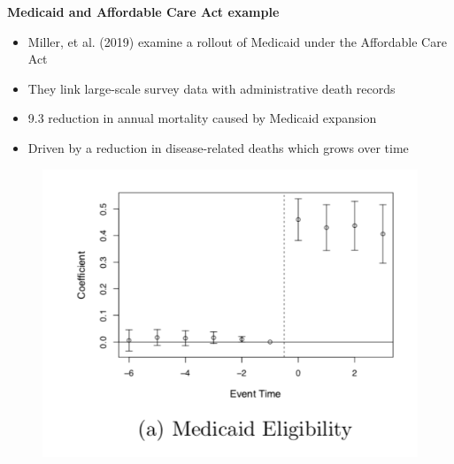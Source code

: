 \documentclass[notes=show]{beamer}
\begin{document}
\begin{frame}[plain]
\begin{center}
\textbf{Medicaid and Affordable Care Act example}
\end{center}

\begin{itemize}
\item Miller, et al. (2019) examine a rollout of Medicaid under the Affordable Care Act
\item They link large-scale survey data with administrative death records
\item 9.3 reduction in annual mortality caused by Medicaid expansion
\item Driven by a reduction in disease-related deaths which grows over time
\end{itemize}

\end{frame}

\begin{frame}[plain]

	\begin{figure}
	\includegraphics[scale=0.5]{./lecture_includes/Miller_Medicaid1}
	\end{figure}

\end{frame}
\end{document}
